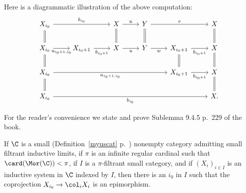 \documentclass[12pt]{article}
\theoremstyle{remark}
\theoremstyle{definition}
\begin{document}
Here is a diagrammatic illustration of the above computation:
$$
\begin{tikzcd}
X_{i_0}\ar[equal]{d}\ar{rr}{b_{i_0}}&&X\ar[equal]{d}\ar{r}{u}&Y\ar[equal]{d}\ar{rr}{v}&&X\ar[equal]{d}\\ 
X_{i_0}\ar[equal]{d}\ar{r}[swap]{u_{i_0+1,i_0}}&X_{i_0+1}\ar{r}[swap]{b_{i_0+1}}&X\ar{r}[swap]{u}&Y\ar{r}[swap]{w}&X_{i_0+1}\ar[equal]{d}\ar{r}[swap]{b_{i_0+1}}&X\ar[equal]{d}\\ 
X_{i_0}\ar[equal]{d}\ar{rrrr}[swap]{u_{i_0+1,i_0}}&&&&X_{i_0+1}\ar{r}[swap]{b_{i_0+1}}&X\ar[equal]{d}\\ 
X_{i_0}\ar{rrrrr}[swap]{b_{i_0}}&&&&&X.
\end{tikzcd}
$$ 

For the reader's convenience we state and prove Sublemma 9.4.5 p.~229 of the book.

\begin{lem}[Sublemma 9.4.5 p.~229]
If $\C$ is a small (Definition~\ref{myuscat} p.~) nonempty category admitting small filtrant inductive limits, if $\pi$ is an infinite regular cardinal such that $\card(\Mor(\C))<\pi$, if $I$ is a $\pi$-filtrant small category, and if $(X_i)_{i\in I}$ is an inductive system in $\C$ indexed by $I$, then there is an $i_0$ in $I$ such that the coprojection $X_{i_0}\to\col_iX_i$ is an epimorphism. 
\end{lem}
\end{document}
